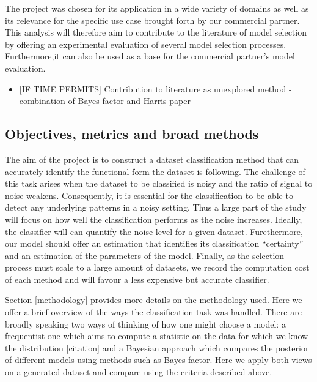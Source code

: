 \documentclass[]{article}
\providecommand{\tightlist}{%
  \setlength{\itemsep}{0pt}\setlength{\parskip}{0pt}}
\begin{document}
The project was chosen for its application in a wide variety of domains
as well as its relevance for the specific use case brought forth by our
commercial partner. This analysis will therefore aim to contribute to
the literature of model selection by offering an experimental evaluation
of several model selection processes. Furthermore,it can also be used as
a base for the commercial partner's model evaluation.

\begin{itemize}
\tightlist
\item
  {[}IF TIME PERMITS{]} Contribution to literature as unexplored method
  - combination of Bayes factor and Harris paper
\end{itemize}

\hypertarget{objectives-metrics-and-broad-methods}{%
\subsection{Objectives, metrics and broad
methods}\label{objectives-metrics-and-broad-methods}}

The aim of the project is to construct a dataset classification method
that can accurately identify the functional form the dataset is
following. The challenge of this task arises when the dataset to be
classified is noisy and the ratio of signal to noise weakens.
Consequently, it is essential for the classification to be able to
detect any underlying patterns in a noisy setting. Thus a large part of
the study will focus on how well the classification performs as the
noise increases. Ideally, the classifier will can quantify the noise
level for a given dataset. Furethermore, our model should offer an
estimation that identifies its classification ``certainty'' and an
estimation of the parameters of the model. Finally, as the selection
process must scale to a large amount of datasets, we record the
computation cost of each method and will favour a less expensive but
accurate classifier.

Section {[}methodology{]} provides more details on the methodology used.
Here we offer a brief overview of the ways the classification task was
handled. There are broadly speaking two ways of thinking of how one
might choose a model: a frequentist one which aims to compute a
statistic on the data for which we know the distribution {[}citation{]}
and a Bayesian approach which compares the posterior of different models
using methods such as Bayes factor. Here we apply both views on a
generated dataset and compare using the criteria described above.
\end{document}
